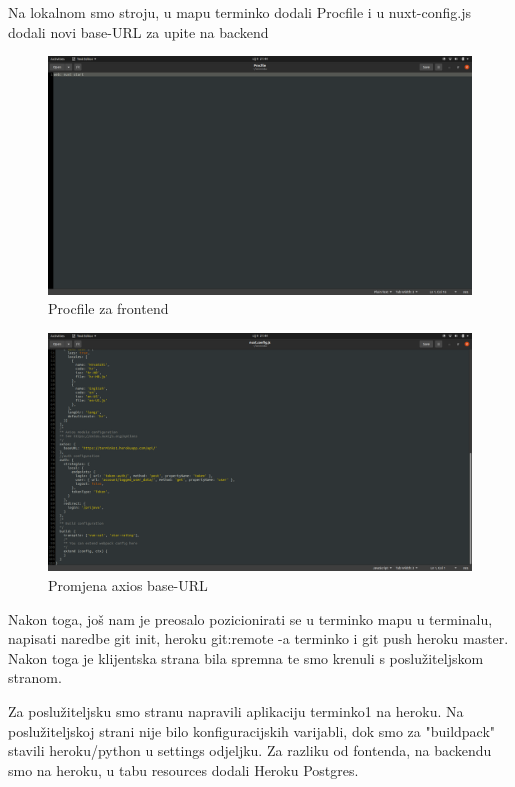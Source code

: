 			Na lokalnom smo stroju, u mapu terminko dodali Procfile i u nuxt-config.js dodali novi base-URL za upite na backend
			
			\begin{figure}[H]
				\centering
				\includegraphics[scale=0.25]{slike/ProcFileFrontend.PNG}
				\caption{Procfile za frontend}
				\label{fig:promjene}
			\end{figure}
			
			\begin{figure}[H]
				\centering
				\includegraphics[scale=0.25]{slike/PromjenaFrontend.PNG}
				\caption{Promjena axios base-URL}
				\label{fig:promjene}
			\end{figure}
		
			Nakon toga, još nam je preosalo pozicionirati se u terminko mapu u terminalu, napisati naredbe git init, heroku git:remote -a terminko i git push heroku master. Nakon toga je klijentska strana bila spremna te smo krenuli s poslužiteljskom stranom.
			
			Za poslužiteljsku smo stranu napravili aplikaciju terminko1 na heroku. Na poslužiteljskoj strani nije bilo konfiguracijskih varijabli, dok smo za "buildpack" stavili heroku/python u settings odjeljku. Za razliku od fontenda, na backendu smo na heroku, u tabu resources dodali Heroku Postgres.
			
